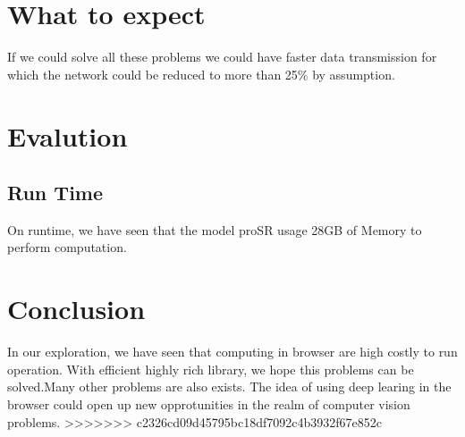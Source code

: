 \documentclass[a4paper,12pt]{article}
\begin{document}
\section{What to expect}
If we could solve all these problems we could have faster data transmission for which the network could be reduced to more than 25\% by assumption.

\section{Evalution}
\subsection{Run Time}
On runtime, we have seen that the model proSR usage 28GB of Memory to perform computation.

\section{Conclusion}
 In our exploration, we have seen that computing in browser are high costly to run operation. With efficient highly rich library, we hope this problems can be solved.Many other problems are also exists. The idea of using deep learing in the browser could open up new opprotunities in the realm of computer vision problems. 
>>>>>>> c2326cd09d45795bc18df7092c4b3932f67e852c




\end{document}
